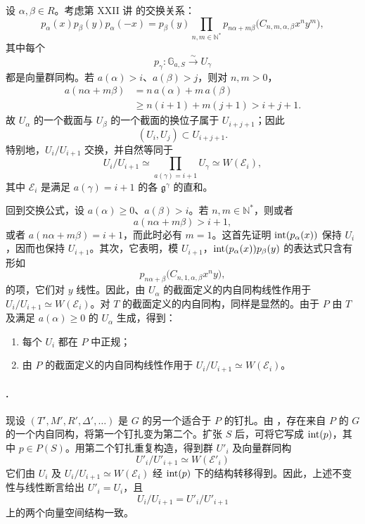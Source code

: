 设 \(\alpha,\beta\in R\)。考虑第 XXII 讲  的交换关系：
\[
 p_\alpha(x)p_\beta(y)p_\alpha(-x)
 =
 p_\beta(y)
 \prod_{n,m\in\mathbb N^*}
 p_{n\alpha+m\beta}
 \bigl(C_{n,m,\alpha,\beta}x^ny^m\bigr),
\]
其中每个
\[
 p_\gamma:\mathbb G_{a,S}\xrightarrow{\sim}U_\gamma
\]
都是向量群同构。若 \(a(\alpha)>i\)、\(a(\beta)>j\)，则对 \(n,m>0\)，
\[
\begin{aligned}
 a(n\alpha+m\beta)
 &=n\,a(\alpha)+m\,a(\beta)\\
 &\geq n(i+1)+m(j+1)>i+j+1.
\end{aligned}
\]
故 \(U_\alpha\) 的一个截面与 \(U_\beta\) 的一个截面的换位子属于 \(U_{i+j+1}\)；因此
\[
 (U_i,U_j)\subset U_{i+j+1}.
\]
特别地，\(U_i/U_{i+1}\) 交换，并自然等同于
\[
 U_i/U_{i+1}
 \simeq
 \prod_{a(\gamma)=i+1}U_\gamma
 \simeq W(\mathcal E_i),
\]
其中 \(\mathcal E_i\) 是满足 \(a(\gamma)=i+1\) 的各 \(\mathfrak g^\gamma\) 的直和。

回到交换公式，设 \(a(\alpha)\geq0\)、\(a(\beta)>i\)。若 \(n,m\in\mathbb N^*\)，则或者
\[
 a(n\alpha+m\beta)>i+1,
\]
或者 \(a(n\alpha+m\beta)=i+1\)，而此时必有 \(m=1\)。这首先证明 \(\operatorname{int}(p_\alpha(x))\) 保持 \(U_i\)，因而也保持 \(U_{i+1}\)。其次，它表明，模 \(U_{i+1}\)，\(\operatorname{int}(p_\alpha(x))p_\beta(y)\) 的表达式只含有形如
\[
 p_{n\alpha+\beta}
 \bigl(C_{n,1,\alpha,\beta}x^ny\bigr),
\]
的项，它们对 \(y\) 线性。因此，由 \(U_\alpha\) 的截面定义的内自同构线性作用于 \(U_i/U_{i+1}\simeq W(\mathcal E_i)\)。对 \(T\) 的截面定义的内自同构，同样是显然的。由于 \(P\) 由 \(T\) 及满足 \(a(\alpha)\geq0\) 的 \(U_\alpha\) 生成，得到：
\begin{enumerate}[label=\textup{(\roman*)}]
\item 每个 \(U_i\) 都在 \(P\) 中正规；
\item 由 \(P\) 的截面定义的内自同构线性作用于 \(U_i/U_{i+1}\simeq W(\mathcal E_i)\)。
\end{enumerate}

\paragraph{.}
现设 \((T',M',R',\Delta',\ldots)\) 是 \(G\) 的另一个适合于 \(P\) 的钉扎。由 ，存在来自 \(P\) 的 \(G\) 的一个内自同构，将第一个钉扎变为第二个。扩张 \(S\) 后，可将它写成 \(\operatorname{int}(p)\)，其中 \(p\in P(S)\)。用第二个钉扎重复构造，得到群 \(U'_i\) 及向量群同构
\[
 U'_i/U'_{i+1}\simeq W(\mathcal E'_i)
\]
它们由 \(U_i\) 及 \(U_i/U_{i+1}\simeq W(\mathcal E_i)\) 经 \(\operatorname{int}(p)\) 下的结构转移得到。因此，上述不变性与线性断言给出 \(U'_i=U_i\)，且
\[
 U_i/U_{i+1}=U'_i/U'_{i+1}
\]
上的两个向量空间结构一致。

